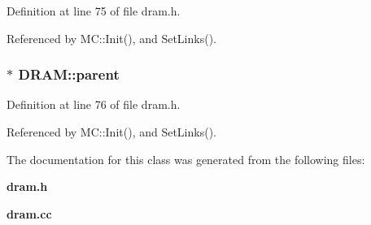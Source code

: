 Definition at line 75 of file dram.h.

Referenced by MC::Init(), and SetLinks().
\subsubsection[{parent}]{$\ast$ {\bf DRAM::parent}}\label{classDRAM_f4aae723a8f9516ce1fefb4427bdee4f}




Definition at line 76 of file dram.h.

Referenced by MC::Init(), and SetLinks().

The documentation for this class was generated from the following files:\begin{CompactItemize}
\item 
{\bf dram.h}\item 
{\bf dram.cc}\end{CompactItemize}
